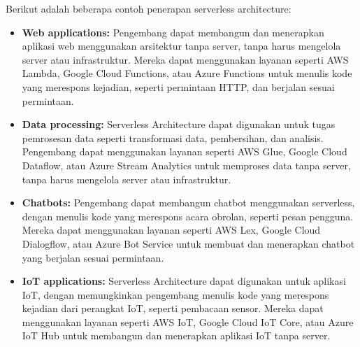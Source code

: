	Berikut adalah beberapa contoh penerapan serverless architecture:
	\begin{itemize}
		\item \textbf{Web applications:} Pengembang dapat membangun dan menerapkan aplikasi web menggunakan arsitektur tanpa server, tanpa harus mengelola server atau infrastruktur. Mereka dapat menggunakan layanan seperti AWS Lambda, Google Cloud Functions, atau Azure Functions untuk menulis kode yang merespons kejadian, seperti permintaan HTTP, dan berjalan sesuai permintaan.
		\item \textbf{Data processing:} Serverless Architecture dapat digunakan untuk tugas pemrosesan data seperti transformasi data, pembersihan, dan analisis. Pengembang dapat menggunakan layanan seperti AWS Glue, Google Cloud Dataflow, atau Azure Stream Analytics untuk memproses data tanpa server, tanpa harus mengelola server atau infrastruktur.
		\item \textbf{Chatbots:} Pengembang dapat membangun chatbot menggunakan serverless, dengan menulis kode yang merespons acara obrolan, seperti pesan pengguna. Mereka dapat menggunakan layanan seperti AWS Lex, Google Cloud Dialogflow, atau Azure Bot Service untuk membuat dan menerapkan chatbot yang berjalan sesuai permintaan.
		\item \textbf {IoT applications:} Serverless Architecture dapat digunakan untuk aplikasi IoT, dengan memungkinkan pengembang menulis kode yang merespons kejadian dari perangkat IoT, seperti pembacaan sensor. Mereka dapat menggunakan layanan seperti AWS IoT, Google Cloud IoT Core, atau Azure IoT Hub untuk membangun dan menerapkan aplikasi IoT tanpa server.
	\end{itemize}


